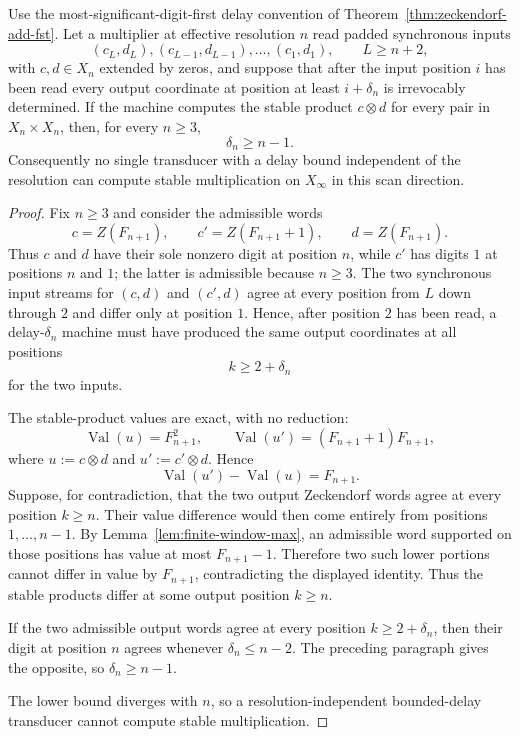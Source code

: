 \begin{theorem}\label{thm:mul-delay-linear-lower-bound}
Use the most-significant-digit-first delay convention of Theorem~\ref{thm:zeckendorf-add-fst}. Let a multiplier at effective resolution $n$ read padded synchronous inputs
\[
(c_L,d_L),(c_{L-1},d_{L-1}),\ldots,(c_1,d_1),
\qquad L\ge n+2,
\]
with $c,d\in X_n$ extended by zeros, and suppose that after the input position $i$ has been read every output coordinate at position at least $i+\delta_n$ is irrevocably determined. If the machine computes the stable product $c\otimes d$ for every pair in $X_n\times X_n$, then, for every $n\ge3$,
\[
\delta_n\ge n-1.
\]
Consequently no single transducer with a delay bound independent of the resolution can compute stable multiplication on $X_\infty$ in this scan direction.
\end{theorem}

\begin{proof}
Fix $n\ge3$ and consider the admissible words
\[
c=Z(F_{n+1}),\qquad c'=Z(F_{n+1}+1),\qquad d=Z(F_{n+1}).
\]
Thus $c$ and $d$ have their sole nonzero digit at position $n$, while $c'$ has digits $1$ at positions $n$ and $1$; the latter is admissible because $n\ge3$. The two synchronous input streams for $(c,d)$ and $(c',d)$ agree at every position from $L$ down through $2$ and differ only at position $1$. Hence, after position $2$ has been read, a delay-$\delta_n$ machine must have produced the same output coordinates at all positions
\[
k\ge 2+\delta_n
\]
for the two inputs.

The stable-product values are exact, with no reduction:
\[
\operatorname{Val}(u)=F_{n+1}^2,
\qquad
\operatorname{Val}(u')=(F_{n+1}+1)F_{n+1},
\]
where $u:=c\otimes d$ and $u':=c'\otimes d$. Hence
\[
\operatorname{Val}(u')-\operatorname{Val}(u)=F_{n+1}.
\]
Suppose, for contradiction, that the two output Zeckendorf words agree at every position $k\ge n$. Their value difference would then come entirely from positions $1,\ldots,n-1$. By Lemma~\ref{lem:finite-window-max}, an admissible word supported on those positions has value at most $F_{n+1}-1$. Therefore two such lower portions cannot differ in value by $F_{n+1}$, contradicting the displayed identity. Thus the stable products differ at some output position $k\ge n$.

If the two admissible output words agree at every position $k\ge2+\delta_n$, then their digit at position $n$ agrees whenever $\delta_n\le n-2$. The preceding paragraph gives the opposite, so $\delta_n\ge n-1$.

The lower bound diverges with $n$, so a resolution-independent bounded-delay transducer cannot compute stable multiplication.
\end{proof}

